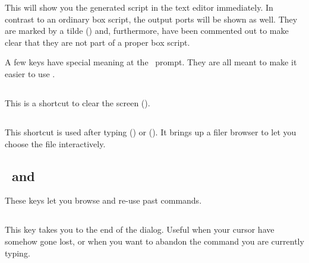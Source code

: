 This will show you the generated script in the text editor immediately. In contrast to an ordinary box script, the output ports will be shown as well. They are marked by a tilde (\mytilde) and, furthermore, have been commented out to make clear that they are not part of a proper box script.


A few keys have special meaning at the \US\ prompt. They are all meant to make it easier to use \US.

\subsection{}
This is a shortcut to clear the screen ().

\subsection{\autofillkey}
This shortcut is used after typing  () or  (). It brings up a filer browser to let you choose the file interactively.

\subsection{\upkey\ and \downkey}
These keys let you browse and re-use past commands.

\subsection{\esckey}
This key takes you to the end of the dialog. Useful when your cursor have somehow gone lost, or when you want to abandon the command you are currently typing.
